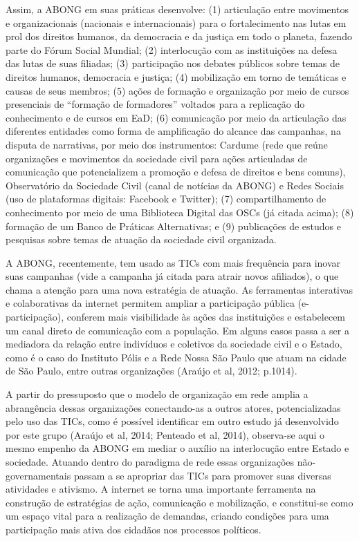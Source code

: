 Assim, a ABONG em suas práticas desenvolve: (1) articulação entre
movimentos e organizacionais (nacionais e internacionais) para o
fortalecimento nas lutas em prol dos direitos humanos, da democracia e
da justiça em todo o planeta, fazendo parte do Fórum Social Mundial; (2)
interlocução com as instituições na defesa das lutas de suas filiadas;
(3) participação nos debates públicos sobre temas de direitos humanos,
democracia e justiça; (4) mobilização em torno de temáticas e causas de
seus membros; (5) ações de formação e organização por meio de cursos
presenciais de ``formação de formadores'' voltados para a replicação do
conhecimento e de cursos em EaD; (6) comunicação por meio da articulação
das diferentes entidades como forma de amplificação do alcance das
campanhas, na disputa de narrativas, por meio dos instrumentos: Cardume
(rede que reúne organizações e movimentos da sociedade civil para ações
articuladas de comunicação que potencializem a promoção e defesa de
direitos e bens comuns), Observatório da Sociedade Civil (canal de
notícias da ABONG) e Redes Sociais (uso de plataformas digitais:
Facebook e Twitter); (7) compartilhamento de conhecimento por meio de
uma Biblioteca Digital das OSCs (já citada acima); (8) formação de um
Banco de Práticas Alternativas; e (9) publicações de estudos e pesquisas
sobre temas de atuação da sociedade civil organizada.

A ABONG, recentemente, tem usado as TICs com mais frequência para inovar
suas campanhas (vide a campanha já citada para atrair novos afiliados),
o que chama a atenção para uma nova estratégia de atuação. As
ferramentas interativas e colaborativas da internet permitem ampliar a
participação pública (e-participação), conferem mais visibilidade às
ações das instituições e estabelecem um canal direto de comunicação com
a população. Em alguns casos passa a ser a mediadora da relação entre
indivíduos e coletivos da sociedade civil e o Estado, como é o caso do
Instituto Pólis e a Rede Nossa São Paulo que atuam na cidade de São
Paulo, entre outras organizações (Araújo et al, 2012; p.1014).

A partir do pressuposto que o modelo de organização em rede amplia a
abrangência dessas organizações conectando-as a outros atores,
potencializadas pelo uso das TICs, como é possível identificar em outro
estudo já desenvolvido por este grupo (Araújo et al, 2014; Penteado et
al, 2014), observa-se aqui o mesmo empenho da ABONG em mediar o auxílio
na interlocução entre Estado e sociedade. Atuando dentro do paradigma de
rede essas organizações não-governamentais passam a se apropriar das
TICs para promover suas diversas atividades e ativismo. A internet se
torna uma importante ferramenta na construção de estratégias de ação,
comunicação e mobilização, e constitui-se como um espaço vital para a
realização de demandas, criando condições para uma participação mais
ativa dos cidadãos nos processos políticos.

